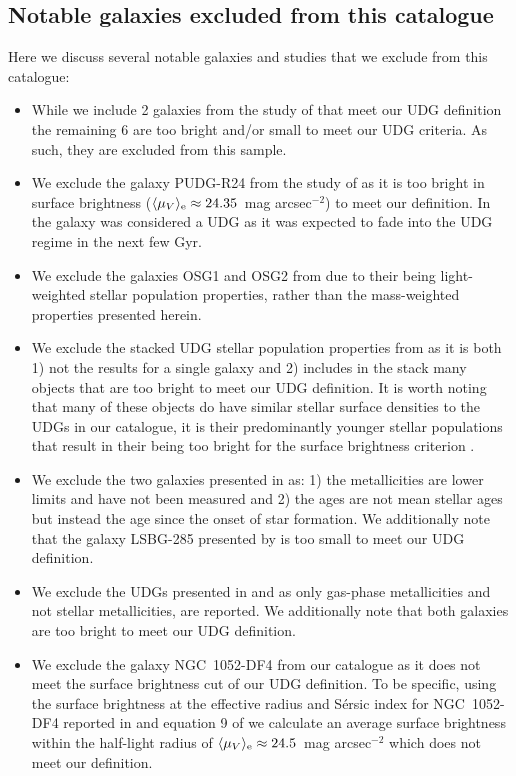 \subsection{Notable galaxies excluded from this catalogue}
Here we discuss several notable galaxies and studies that we exclude from this catalogue:

\begin{itemize}
    \item While we include 2 galaxies from the study of \citet{Chilingarian2019} that meet our UDG definition the remaining 6 are too bright and/or small to meet our UDG criteria. As such, they are excluded from this sample. 
    \item We exclude the galaxy PUDG-R24 from the study of \citet{Gannon2022} as it is too bright in surface brightness ($\langle \mu_{V} \rangle_{\rm e} \approx 24.35$~mag arcsec$^{-2}$) to meet our definition. In \citet{Gannon2022} the galaxy was considered a UDG as it was expected to fade into the UDG regime in the next few Gyr. 
    \item We exclude the galaxies OSG1 and OSG2 from \citet{RuizLara2018} due to their being light-weighted stellar population properties, rather than the mass-weighted properties presented herein. 
    \item We exclude the stacked UDG stellar population properties from \citet{Rong2020} as it is both 1) not the results for a single galaxy and 2) includes in the stack many objects that are too bright to meet our UDG definition. It is worth noting that many of these objects do have similar stellar surface densities to the UDGs in our catalogue, it is their predominantly younger stellar populations that result in their being too bright for the surface brightness criterion \citep{Rong2020}.
    \item We exclude the two galaxies presented in \citet{Greco2018} as: 1) the metallicities are lower limits and have not been measured and 2) the ages are not mean stellar ages but instead the age since the onset of star formation. We additionally note that the galaxy LSBG-285 presented by \citet{Greco2018} is too small to meet our UDG definition.
    \item  We exclude the UDGs presented in \citet{Trujillo2017} and \citet{Bellazzini2017} as only gas-phase metallicities and not stellar metallicities, are reported. We additionally note that both \citet{Bellazzini2017} galaxies are too bright to meet our UDG definition. 
    \item We exclude the galaxy NGC~1052-DF4 \citep{vanDokkum2019} from our catalogue as it does not meet the surface brightness cut of our UDG definition. To be specific, using the surface brightness at the effective radius and S\'ersic index for NGC~1052-DF4 reported in \citet[25.1 mag arcsec$^{-2}$ and 0.79 respectively]{Cohen2018} and equation 9 of \citet{Graham2005} we calculate an average surface brightness within the half-light radius of $\langle \mu_{V} \rangle_{\rm e} \approx 24.5$~mag arcsec$^{-2}$ which does not meet our definition. 

\end{itemize}
